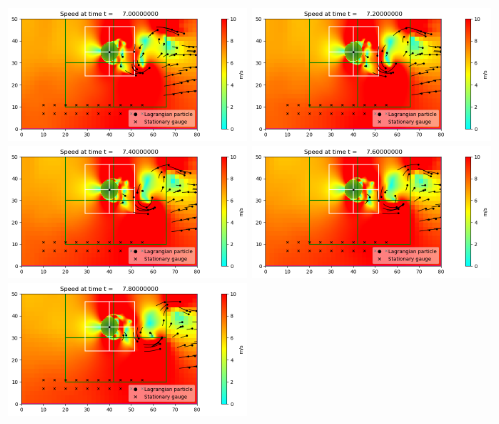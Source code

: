 \documentclass[11pt]{article}
\begin{document}
\vskip 10pt 
\includegraphics[width=0.475\textwidth]{frame0035fig0.png}
\vskip 10pt 
\includegraphics[width=0.475\textwidth]{frame0036fig0.png}
\vskip 10pt 
\includegraphics[width=0.475\textwidth]{frame0037fig0.png}
\vskip 10pt 
\includegraphics[width=0.475\textwidth]{frame0038fig0.png}
\vskip 10pt 
\includegraphics[width=0.475\textwidth]{frame0039fig0.png}
\end{document}

